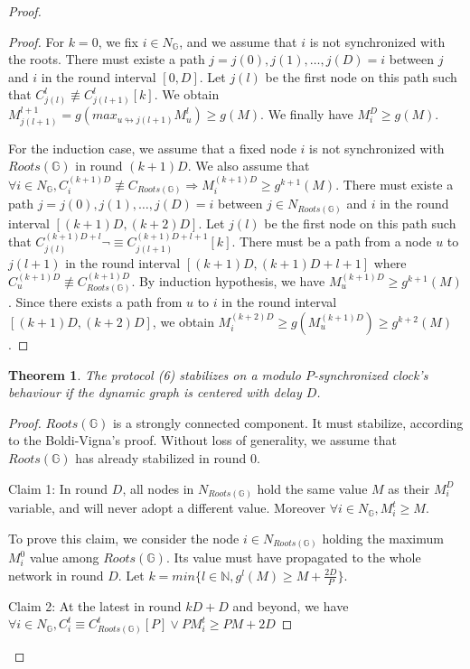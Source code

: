 \documentclass[11pt,letterpaper]{article}
\newtheorem{thm}{Theorem}
\begin{document}
\begin{proof}
\begin{proof}
	For $k = 0$, we fix $i \in N_\mathds{G}$, and we assume that $i$ is not synchronized with the roots.
	There must existe a path $j = j(0), j(1), \dots, j(D) = i$ between $j$ and $i$ in the round interval $[0, D]$.
	Let $j(l)$ be the first node on this path such that $C_{j(l)}^l \not\equiv C_{j(l+1)}^l [k]$.
	We obtain $M_{j(l+1)}^{l+1} = g(max_{u \looparrowright j(l+1)} M_u^l) \geq g(M)$.
	We finally have $M_i^D \geq g(M)$.

	For the induction case, we assume that a fixed node $i$ is not synchronized with $Roots(\mathds{G})$ in round $(k+1)D$.
	We also assume that $\forall i \in N_\mathds{G}, C_i^{(k+1)D} \not\equiv C_{Roots(\mathds{G})} \Rightarrow M_i^{(k+1)D} \geq g^{k+1}(M)$.
	There must existe a path $j = j(0), j(1), \dots, j(D) = i$ between $j \in N_{Roots(\mathds{G})}$ and $i$ in the round interval $[(k+1)D, (k+2)D]$.
	Let $j(l)$ be the first node on this path such that $C_{j(l)}^{(k+1)D+l} \neg\equiv C_{j(l+1)}^{(k+1)D+l+1} [k]$.
	There must be a path from a node $u$ to $j(l+1)$ in the round interval $[(k+1)D, (k+1)D+l+1]$ where $C_u^{(k+1)D} \not\equiv C^{(k+1)D}_{Roots(\mathds{G})}$.
	By induction hypothesis, we have $M_u^{(k+1)D} \geq g^{k+1}(M)$.
	Since there exists a path from $u$ to $i$ in the round interval $[(k+1)D, (k+2)D]$,
	we obtain $M_i^{(k+2)D} \geq g(M_u^{(k+1)D}) \geq g^{k+2}(M)$.
\end{proof}

\begin{thm}
	The protocol (6) stabilizes on a modulo $P$-synchronized clock's behaviour if the dynamic graph is centered with delay $D$.
\end{thm}
\begin{proof}
	\noindent $Roots(\mathds{G})$ is a strongly connected component. It must stabilize, according to the Boldi-Vigna's proof.
	Without loss of generality, we assume that $Roots(\mathds{G})$ has already stabilized in round 0.

	\noindent Claim 1: In round $D$, all nodes in $N_{Roots(\mathds{G})}$ hold the same value $M$ as their $M_i^D$ variable, and will never adopt a different value.
	Moreover $\forall i \in N_\mathds{G}, M_i^t \geq M$.

	\noindent To prove this claim, we consider the node $i \in N_{Roots(\mathds{G})}$ holding the maximum $M_i^0$ value among $Roots(\mathds{G})$.
	Its value must have propagated to the whole network in round $D$.
	Let $k = min \{l \in \mathds{N}, g^l(M) \geq M+\frac{2D}{P}\}$.

	\noindent Claim 2: At the latest in round $kD+D$ and beyond, we have $\forall i \in N_\mathds{G}, C_i^t \equiv C_{Roots(\mathds{G})}^t [P] \vee PM_i^t \geq PM+2D$


\end{proof}
\end{proof}
\end{document}
